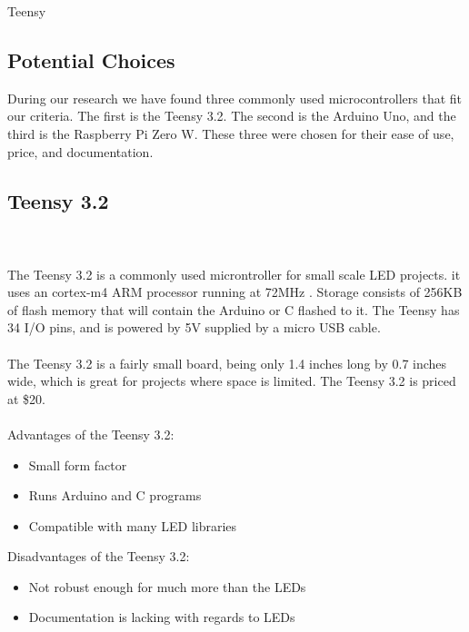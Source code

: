 Teensy\documentclass[onecolumn, draftclsnofoot,10pt, compsoc]{IEEEtran}
\begin{document}
		\subsection{Potential Choices}
		During our research we have found three commonly used microcontrollers that
		fit our criteria. The first is the Teensy 3.2. The second is the Arduino Uno,
		and the third is the Raspberry Pi Zero W. These three were chosen for their
		ease of use, price, and documentation.
		\subsection{Teensy 3.2}
		\\\\
		The Teensy 3.2 is a commonly used microntroller for small scale LED projects.
		it uses an cortex-m4 ARM processor running at 72MHz \cite[Pg 2]{K20}. Storage consists
		of 256KB of flash memory that will contain the Arduino or C flashed to it.
		The Teensy has 34 I/O pins, and is powered by 5V supplied by a micro USB
		cable.
		\\\\
		\noindent The Teensy 3.2 is a fairly small board, being only 1.4 inches long
		by 0.7 inches wide, which is great for projects where space is limited. The
		Teensy 3.2 is priced at \$20.
		\\\\
		Advantages of the Teensy 3.2:
		\begin{itemize}
			\item Small form factor
			\item Runs Arduino and C programs
			\item Compatible with many LED libraries
		\end{itemize}
		Disadvantages of the Teensy 3.2:
		\begin{itemize}
			\item Not robust enough for much more than the LEDs
			\item Documentation is lacking with regards to LEDs
		\end{itemize}
\end{document}
